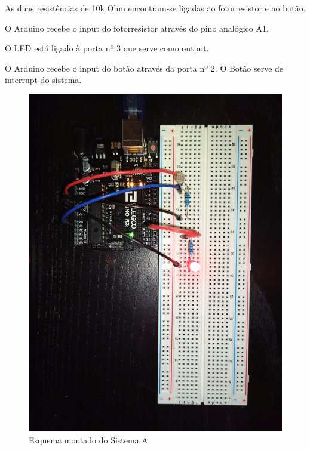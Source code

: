 As duas resistências de 10k Ohm encontram-se ligadas ao fotorresistor e ao botão.

O Arduino recebe o input do fotorresistor através do pino analógico A1.

O LED está ligado à porta nº 3 que serve como output.

O Arduino recebe o input do botão através da porta nº 2. O Botão serve de interrupt do sistema.

\begin{figure}[H]
    \centering
    \includegraphics[scale=0.05,angle=90]{images/hardware/sisA_IRL.jpg}
    \caption{Esquema montado do Sistema A}
\end{figure}